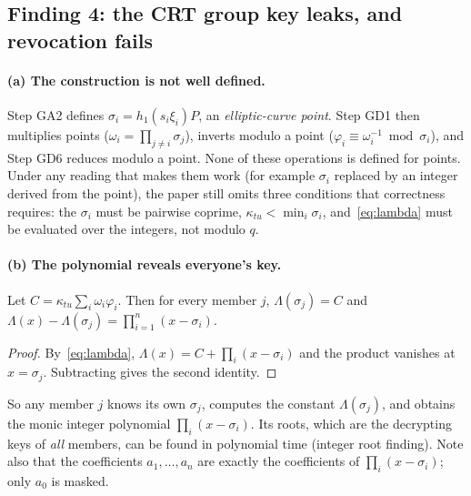 \subsection{Finding 4: the CRT group key leaks, and revocation fails}
\paragraph{(a) The construction is not well defined.}
Step GA2 defines $\sigma_i=h_1(s_i\xi_i)P$, an \emph{elliptic-curve point}. Step GD1 then multiplies points ($\omega_i=\prod_{j\ne i}\sigma_j$), inverts
modulo a point ($\varphi_i\equiv\omega_i^{-1}\bmod\sigma_i$), and Step GD6 reduces modulo a point. None of these operations is defined for points.
Under any reading that makes them work (for example $\sigma_i$ replaced by an integer derived from the point), the paper still omits three conditions
that correctness requires: the $\sigma_i$ must be pairwise coprime, $\kappa_{tu}<\min_i\sigma_i$, and~\eqref{eq:lambda} must be evaluated over the
integers, not modulo $q$.

\paragraph{(b) The polynomial reveals everyone's key.}
\begin{lemma}\label{lem:leak}
Let $C=\kappa_{tu}\sum_i\omega_i\varphi_i$. Then for every member $j$, \;$\Lambda(\sigma_j)=C$ \;and\; $\Lambda(x)-\Lambda(\sigma_j)=\prod_{i=1}^{n}(x-\sigma_i)$.
\end{lemma}
\begin{proof}
By~\eqref{eq:lambda}, $\Lambda(x)=C+\prod_i(x-\sigma_i)$ and the product vanishes at $x=\sigma_j$. Subtracting gives the second identity.
\end{proof}
So any member $j$ knows its own $\sigma_j$, computes the constant $\Lambda(\sigma_j)$, and obtains the monic integer polynomial $\prod_i(x-\sigma_i)$.
Its roots, which are the decrypting keys of \emph{all} members, can be found in polynomial time (integer root finding). Note also that the coefficients
$a_1,\dots,a_n$ are exactly the coefficients of $\prod_i(x-\sigma_i)$; only $a_0$ is masked.

